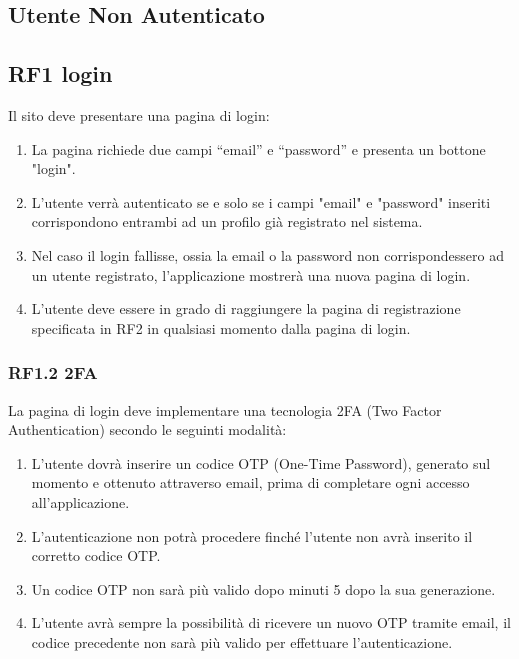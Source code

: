 \documentclass{report}
\begin{document}
\subsection{Utente Non Autenticato}

\subsection*{RF1 login}
Il sito deve presentare una pagina di login:
\begin{enumerate}
	\item La pagina richiede due campi “email” e “password” e presenta un bottone "login".
	
	\item L'utente verrà autenticato se e solo se i campi "email" e "password" inseriti corrispondono entrambi ad un profilo già registrato nel sistema.
	
	\item Nel caso il login fallisse, ossia la email o la password non corrispondessero ad un utente registrato, l’applicazione mostrerà una nuova pagina di login.
	
	\item L’utente deve essere in grado di raggiungere la pagina di registrazione specificata in RF2 in qualsiasi momento dalla pagina di login.
	
\end{enumerate}

	\subsubsection{RF1.2 2FA}
	La pagina di login deve implementare una tecnologia 2FA (Two Factor Authentication) secondo le seguinti modalità:
	
	\begin{enumerate}
	\item L’utente dovrà inserire un codice OTP (One-Time Password), generato sul momento e ottenuto attraverso email, prima di completare ogni accesso all’applicazione. 
	
	\item 	L’autenticazione non potrà procedere finché l’utente non avrà inserito il corretto codice OTP.
	
	\item Un codice OTP non sarà più valido dopo minuti 5 dopo la sua generazione.
	
	\item L’utente avrà sempre la possibilità di ricevere un nuovo OTP tramite email, il codice precedente non sarà più valido per effettuare l’autenticazione.

	\end{enumerate}
	
\end{document}
